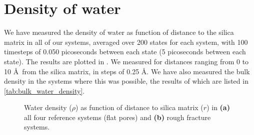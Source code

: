 \section{Density of water\label{sec:results_density}}

We have measured the density of water as function of distance to the silica matrix in all of our systems, averaged over 200 states for each system, with 100 timesteps of 0.050 picoseconds between each state (5 picoseconds between each state). The results are plotted in . We measured for distances ranging from 0 to 10 \AA\ from the silica matrix, in steps of 0.25 \AA. We have also measured the bulk density in the systems where this was possible, the results of which are listed in \cref{tab:bulk_water_density}.%
%
\begin{figure}[!htb]%
    \setlength{\myfigwidth}{0.58\textwidth}%
    \vspace{8pt}%
    \caption{%
        Water density ($\rho$) as function of distance to silica matrix ($r$) in \textbf{(a)} all four reference systems (flat pores) and \textbf{(b)} rough fracture systems.%
        \label{fig:first_density_fig}%
    }%
\end{figure}%

